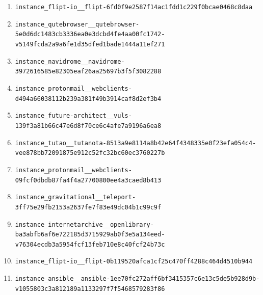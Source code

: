 \begin{enumerate}
\item \texttt{instance\_\allowbreak{}flipt-\allowbreak{}io\_\allowbreak{}\_\allowbreak{}flipt-\allowbreak{}6fd0f9e2587f14\allowbreak{}ac1fdd1c229f0b\allowbreak{}cae0468c8daa}
\item \texttt{instance\_\allowbreak{}qutebrowser\_\allowbreak{}\_\allowbreak{}qutebrowser-\allowbreak{}5e0d6dc1483cb3\allowbreak{}336ea0e3dcbd4f\allowbreak{}e4aa00fc1742-\allowbreak{}v5149fcda2a9a6\allowbreak{}fe1d35dfed1bad\allowbreak{}e1444a11ef271}
\item \texttt{instance\_\allowbreak{}navidrome\_\allowbreak{}\_\allowbreak{}navidrome-\allowbreak{}3972616585e823\allowbreak{}05eaf26aa25697\allowbreak{}b3f5f3082288}
\item \texttt{instance\_\allowbreak{}protonmail\_\allowbreak{}\_\allowbreak{}webclients-\allowbreak{}d494a66038112b\allowbreak{}239a381f49b391\allowbreak{}4caf8d2ef3b4}
\item \texttt{instance\_\allowbreak{}future-\allowbreak{}architect\_\allowbreak{}\_\allowbreak{}vuls-\allowbreak{}139f3a81b66c47\allowbreak{}e6d8f70ce6c4af\allowbreak{}e7a9196a6ea8}
\item \texttt{instance\_\allowbreak{}tutao\_\allowbreak{}\_\allowbreak{}tutanota-\allowbreak{}8513a9e8114a8b\allowbreak{}42e64f4348335e\allowbreak{}0f23efa054c4-\allowbreak{}vee878bb720918\allowbreak{}75e912c52fc32b\allowbreak{}c60ec3760227b}
\item \texttt{instance\_\allowbreak{}protonmail\_\allowbreak{}\_\allowbreak{}webclients-\allowbreak{}09fcf0dbdb87fa\allowbreak{}4f4a27700800ee\allowbreak{}4a3caed8b413}
\item \texttt{instance\_\allowbreak{}gravitational\_\allowbreak{}\_\allowbreak{}teleport-\allowbreak{}3ff75e29fb2153\allowbreak{}a2637fe7f83e49\allowbreak{}dc04b1c99c9f}
\item \texttt{instance\_\allowbreak{}internetarchiv\allowbreak{}e\_\allowbreak{}\_\allowbreak{}openlibrary-\allowbreak{}ba3abfb6af6e72\allowbreak{}2185d3715929ab\allowbreak{}0f3e5a134eed-\allowbreak{}v76304ecdb3a59\allowbreak{}54fcf13feb710e\allowbreak{}8c40fcf24b73c}
\item \texttt{instance\_\allowbreak{}flipt-\allowbreak{}io\_\allowbreak{}\_\allowbreak{}flipt-\allowbreak{}0b119520afca1c\allowbreak{}f25c470ff4288c\allowbreak{}464d4510b944}
\item \texttt{instance\_\allowbreak{}ansible\_\allowbreak{}\_\allowbreak{}ansible-\allowbreak{}1ee70fc272aff6\allowbreak{}bf3415357c6e13\allowbreak{}c5de5b928d9b-\allowbreak{}v1055803c3a812\allowbreak{}189a1133297f7f\allowbreak{}5468579283f86}

\end{enumerate}
